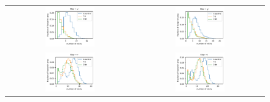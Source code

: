 \documentclass[preprintm,linenumbers]{aastex631}
\begin{document}
		\begin{figure}
			\centering
			\begin{tabular}{c c}
			
    				\includegraphics[width=0.4\textwidth]{results/histograms/hist_first_year_one_snap_v4_0_10yrs_db_noDD_noTwi_CountMetric_doAllTemplateMetrics_reduceCount_u_noDD_noTwi.pdf} &
				\includegraphics[width=0.4\textwidth]{results/histograms/hist_first_year_one_snap_v4_0_10yrs_db_noDD_noTwi_CountMetric_doAllTemplateMetrics_reduceCount_g_noDD_noTwi.pdf} \\
				\includegraphics[width=0.4\textwidth]{results/histograms/hist_first_year_one_snap_v4_0_10yrs_db_noDD_noTwi_CountMetric_doAllTemplateMetrics_reduceCount_r_noDD_noTwi.pdf} &
				\includegraphics[width=0.4\textwidth]{results/histograms/hist_first_year_one_snap_v4_0_10yrs_db_noDD_noTwi_CountMetric_doAllTemplateMetrics_reduceCount_i_noDD_noTwi.pdf} \\

\end{tabular}
\end{figure}
\end{document}
